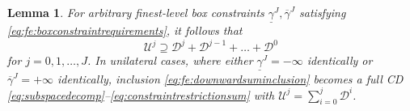 \documentclass[letterpaper,final,12pt,reqno]{amsart}
\theoremstyle{cstyle}
\newtheorem{lemma}[theorem]{Lemma}
\theoremstyle{cstyle*}
\theoremstyle{dstyle}
\numberwithin{equation}{section}
\numberwithin{figure}{section}
\numberwithin{table}{section}
\numberwithin{theorem}{section}
\begin{document}
\begin{lemma}  \label{lem:downwardadmissibility}  For arbitrary finest-level box constraints $\underline{\gamma}^J,\overline{\gamma}^J$ satisfying \eqref{eq:fe:boxconstraintrequirements}, it follows that
\begin{equation}
\mathcal{U}^j \supseteq \mathcal{D}^j + \mathcal{D}^{j-1} + \dots + \mathcal{D}^0 \label{eq:fe:downwardsuminclusion}
\end{equation}
for $j=0,1,\dots,J$.  In unilateral cases, where either $\underline{\gamma}^J=-\infty$ identically or $\overline{\gamma}^J=+\infty$ identically, inclusion \eqref{eq:fe:downwardsuminclusion} becomes a full CD \eqref{eq:subspacedecomp}--\eqref{eq:constraintrestrictionsum} with $\mathcal{U}^j=\sum_{i=0}^j \mathcal{D}^i$.
\end{lemma}
\end{document}
